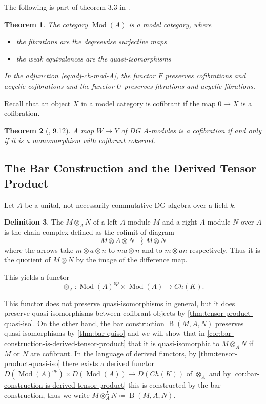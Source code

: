 \documentclass{scrartcl}
\let\emph\relax
\theoremstyle{plain}
\newtheorem{theorem}{Theorem}[section]
\theoremstyle{definition}
\newtheorem{definition}[theorem]{Definition}
\newcommand{\defeq}{\coloneqq}
\DeclareMathOperator{\Mod}{Mod}
\DeclareMathOperator{\BC}{B}
\begin{document}
The following is part of theorem 3.3 in \cite{barthel2013six}.
\begin{theorem}
    The category $\Mod(A)$ is a model category, where
    \begin{itemize}
        \item the fibrations are the degreewise surjective maps
        \item the weak equivalences are the quasi-isomorphisms
    \end{itemize}
    In the adjunction \ref{eq:adj-ch-mod-A}, the functor $F$ preserves cofibrations and acyclic cofibrations and the functor $U$ preserves fibrations and acyclic fibrations.
\end{theorem} 

Recall that an object $X$ in a model category is cofibrant if the map $0\to X$ is a cofibration. 
\begin{theorem}[\cite{barthel2013six}, 9.12]\label{thm:dg-module-cofibrant-cokernel}
    A map $W\to Y$ of DG $A$-modules is a cofibration if and only if it is a monomorphism with cofibrant cokernel. 
\end{theorem}


\subsection{The Bar Construction and the Derived Tensor Product}\label{subsec:bar-constr-derived}
Let $A$ be a unital, not necessarily commutative DG algebra over a field $k$.
\begin{definition}
The \emph{tensor product} $M\otimes_A N$ of a left $A$-module $M$ and a right $A$-module $N$ over $A$ is the chain complex defined as the colimit of diagram $$M\otimes A\otimes N\rightrightarrows M\otimes N$$
where the arrows take $m\otimes a\otimes n$ to $ma\otimes n$ and to $m\otimes an$ respectively. Thus it is the quotient of $M\otimes N$ by the image of the difference map. 
\end{definition}
This yields a functor 
$$\otimes_A \colon \Mod(A)^{op}\times \Mod(A)\to Ch(K).$$

This functor does not preserve quasi-isomorphisms in general, but it does preserve quasi-isomorphisms between cofibrant objects by \cref{thm:tensor-product-quasi-iso}. On the other hand, the bar construction $\BC(M, A, N)$ preserves quasi-isomorphisms by \cref{thm:bar-quiso} and we will show that in \cref{cor:bar-construction-is-derived-tensor-product} that it is quasi-isomorphic to $M \otimes_A N$ if $M$ or $N$ are cofibrant. In the language of derived functors, by \cref{thm:tensor-product-quasi-iso} there exists a derived functor $D(\Mod(A)^{op})\times D(\Mod(A))\to D(Ch(K))$ of $\otimes_A$ and by \cref{cor:bar-construction-is-derived-tensor-product} this is constructed by the bar construction, thus we write $M\otimes_A^L N\defeq \BC(M, A, N)$. 
\end{document}
